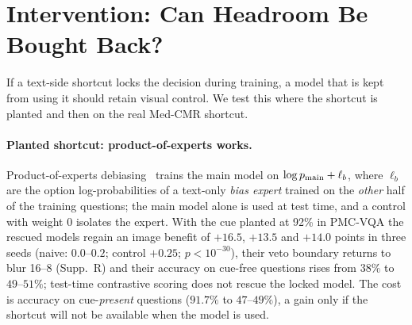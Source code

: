 \section{Intervention: Can Headroom Be Bought Back?}
\label{sec:remedy}

If a text-side shortcut locks the decision during training, a model that is kept from using it should retain visual control.
We test this where the shortcut is planted and then on the real Med-CMR shortcut.

\paragraph{Planted shortcut: product-of-experts works.}
Product-of-experts debiasing~\cite{clark2019dont,cadene2019rubi} trains the main model on $\log p_{\rm main}+\ell_b$, where $\ell_b$ are the option log-probabilities of a text-only \emph{bias expert} trained on the \emph{other} half of the training questions; the main model alone is used at test time, and a control with weight $0$ isolates the expert.
With the cue planted at 92\% in PMC-VQA the rescued models regain an image benefit of $+16.5$, $+13.5$ and $+14.0$ points in three seeds (naive: $0.0$--$0.2$; control $+0.25$; $p<10^{-30}$), their veto boundary returns to blur 16--8 (Supp.~R) and their accuracy on cue-free questions rises from $38\%$ to $49$--$51\%$; test-time contrastive scoring does not rescue the locked model.
The cost is accuracy on cue-\emph{present} questions ($91.7\%$ to $47$--$49\%$), a gain only if the shortcut will not be available when the model is used.


